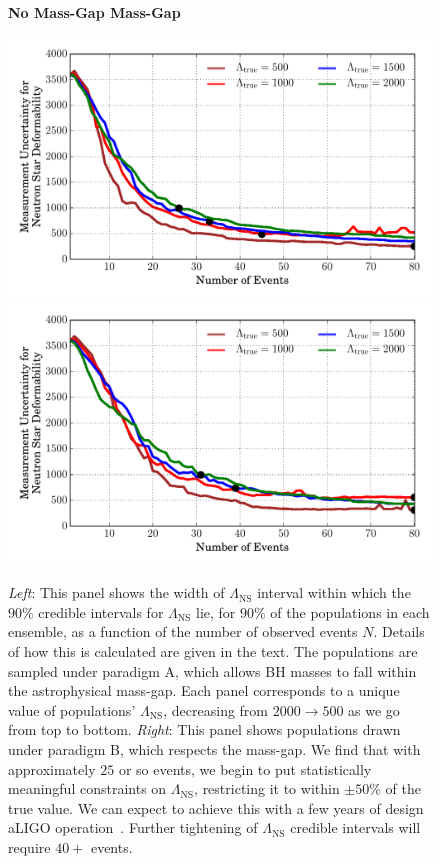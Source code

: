 \documentclass[aps,prd,amsmath,floats,floatfix, twocolumn,
superscriptaddress,nofootinbib,showpacs]{revtex4-1}
\newcommand{\lambdans}{\Lambda_\mathrm{NS}}
\begin{document}
\begin{figure}
\centering    
\textbf{No Mass-Gap \hspace{6cm} Mass-Gap}\par\medskip
\includegraphics[width=1.025\columnwidth,trim=1cm 0 0 0]{plots/LambdaCIWidths90pc_vs_N_AllPopulation}
\includegraphics[width=1.025\columnwidth,trim=0 0 1cm 0]{plots/LambdaCIWidths90pc_vs_N_AstroPopulation}
\caption{%
{\it Left}: This panel shows the width of $\lambdans$ interval within
which the $90\%$ credible intervals for $\lambdans$ lie, for $90\%$ of 
the populations in each ensemble, as a function of the number of observed events
$N$. Details of how this is calculated are given in the text.
% 
The populations are sampled under paradigm A, which allows BH masses to
fall within the astrophysical mass-gap.
Each panel corresponds to a unique value of populations' $\lambdans$,
decreasing from $2000\rightarrow 500$ as we go from top to bottom.
% 
{\it Right}: This panel shows populations drawn under paradigm B, which
respects the mass-gap.
% 
We find that with approximately $25$ or so events, we begin to put
statistically meaningful constraints on $\lambdans$, restricting it to within
$\pm 50\%$ of the true value. We can expect to achieve this with a few years
of design aLIGO operation~\cite{Abadie:2010cfa}. Further tightening of 
$\lambdans$ credible intervals will require $40+$ events.
}
\label{fig:TT_LambdaError_vs_N_L500_2000_CI90_0_AllInOne}
\end{figure}
\end{document}
